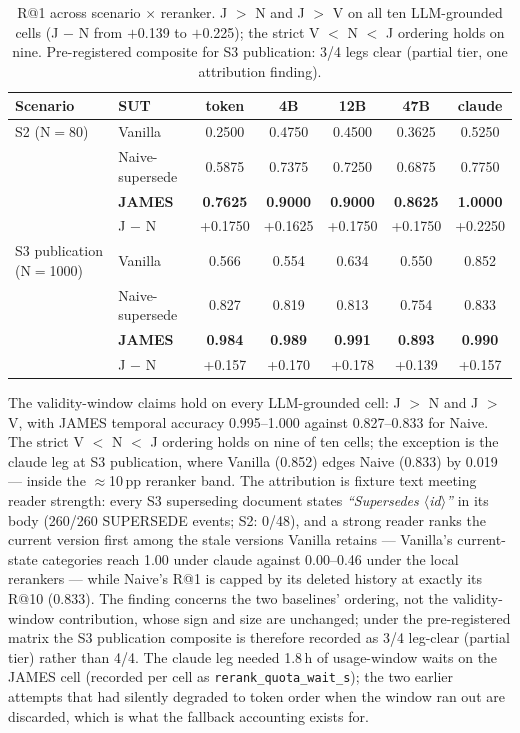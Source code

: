 \documentclass[11pt,a4paper]{article}
\begin{document}
\begin{table}[h]
\centering
\caption{R@1 across scenario $\times$ reranker. J $>$ N and J $>$ V on all ten LLM-grounded cells (J $-$ N from $+$0.139 to $+$0.225); the strict V $<$ N $<$ J ordering holds on nine. Pre-registered composite for S3 publication: 3/4 legs clear (partial tier, one attribution finding).}
\label{tab:cross_scale_model}
\begin{tabular}{l l c c c c c}
\toprule
\textbf{Scenario} & \textbf{SUT} & \textbf{token} & \textbf{4B} & \textbf{12B} & \textbf{47B} & \textbf{claude} \\
\midrule
S2 (N$=$80) & Vanilla & 0.2500 & 0.4750 & 0.4500 & 0.3625 & 0.5250 \\
 & Naive-supersede & 0.5875 & 0.7375 & 0.7250 & 0.6875 & 0.7750 \\
 & \textbf{JAMES} & \textbf{0.7625} & \textbf{0.9000} & \textbf{0.9000} & \textbf{0.8625} & \textbf{1.0000} \\
 & J $-$ N & +0.1750 & +0.1625 & +0.1750 & +0.1750 & +0.2250 \\
\midrule
S3 publication (N$=$1000) & Vanilla & 0.566 & 0.554 & 0.634 & 0.550 & 0.852 \\
 & Naive-supersede & 0.827 & 0.819 & 0.813 & 0.754 & 0.833 \\
 & \textbf{JAMES} & \textbf{0.984} & \textbf{0.989} & \textbf{0.991} & \textbf{0.893} & \textbf{0.990} \\
 & J $-$ N & +0.157 & +0.170 & +0.178 & +0.139 & +0.157 \\
\bottomrule
\end{tabular}
\end{table}

The validity-window claims hold on every LLM-grounded cell: J $>$ N and J $>$ V, with JAMES temporal accuracy 0.995--1.000 against 0.827--0.833 for Naive. The strict V $<$ N $<$ J ordering holds on nine of ten cells; the exception is the claude leg at S3 publication, where Vanilla (0.852) edges Naive (0.833) by 0.019 --- inside the $\approx$10\,pp reranker band. The attribution is fixture text meeting reader strength: every S3 superseding document states \emph{``Supersedes $\langle$id$\rangle$''} in its body (260/260 SUPERSEDE events; S2: 0/48), and a strong reader ranks the current version first among the stale versions Vanilla retains --- Vanilla's current-state categories reach 1.00 under claude against 0.00--0.46 under the local rerankers --- while Naive's R@1 is capped by its deleted history at exactly its R@10 (0.833). The finding concerns the two baselines' ordering, not the validity-window contribution, whose sign and size are unchanged; under the pre-registered matrix the S3 publication composite is therefore recorded as 3/4 leg-clear (partial tier) rather than 4/4. The claude leg needed 1.8\,h of usage-window waits on the JAMES cell (recorded per cell as \texttt{rerank\_quota\_wait\_s}); the two earlier attempts that had silently degraded to token order when the window ran out are discarded, which is what the fallback accounting exists for.
\end{document}
